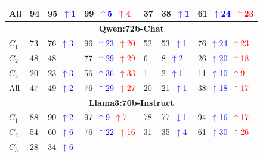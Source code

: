 \begin{table}
\begin{tabularx}{\textwidth}{l X X X X X X}
All 
& 94 
& 95~\textcolor{blue}{\scriptsize$\uparrow$1}   
& 99~\textcolor{blue}{\scriptsize$\uparrow$5}~\textcolor{red}{\scriptsize$\uparrow$4}
& 37 
& 38~\textcolor{blue}{\scriptsize$\uparrow$1}   
& 61~\textcolor{blue}{\scriptsize$\uparrow$24}~\textcolor{red}{\scriptsize$\uparrow$23} \\
\midrule
\multicolumn{7}{c}{\small\textbf{Qwen:72b-Chat}} \\
\midrule
$C_1$ 
& 73 
& 76~\textcolor{blue}{\scriptsize$\uparrow$3}   
& 96~\textcolor{blue}{\scriptsize$\uparrow$23}~\textcolor{red}{\scriptsize$\uparrow$20}
& 52 
& 53~\textcolor{blue}{\scriptsize$\uparrow$1}   
& 76~\textcolor{blue}{\scriptsize$\uparrow$24}~\textcolor{red}{\scriptsize$\uparrow$23} \\
$C_2$ 
& 48
& 48~\textcolor{blue}   
& 77~\textcolor{blue}{\scriptsize$\uparrow$29}~\textcolor{red}{\scriptsize$\uparrow$29}
& 6 
& 8~\textcolor{blue}{\scriptsize$\uparrow$2}   
& 26~\textcolor{blue}{\scriptsize$\uparrow$20}~\textcolor{red}{\scriptsize$\uparrow$18} \\
$C_3$ 
& 20 
& 23~\textcolor{blue}{\scriptsize$\uparrow$3}   
& 56~\textcolor{blue}{\scriptsize$\uparrow$36}~\textcolor{red}{\scriptsize$\uparrow$33}
& 1 
& 2~\textcolor{blue}{\scriptsize$\uparrow$1}   
& 11~\textcolor{blue}{\scriptsize$\uparrow$10}~\textcolor{red}{\scriptsize$\uparrow$9} \\
All 
& 47 
& 49~\textcolor{blue}{\scriptsize$\uparrow$2}   
& 76~\textcolor{blue}{\scriptsize$\uparrow$29}~\textcolor{red}{\scriptsize$\uparrow$27}
& 20 
& 21~\textcolor{blue}{\scriptsize$\uparrow$1}   
& 38~\textcolor{blue}{\scriptsize$\uparrow$18}~\textcolor{red}{\scriptsize$\uparrow$17} \\
\midrule
\multicolumn{7}{c}{\small\textbf{Llama3:70b-Instruct}} \\
\midrule
$C_1$ 
& 88 
& 90~\textcolor{blue}{\scriptsize$\uparrow$2}   
& 97~\textcolor{blue}{\scriptsize$\uparrow$9}~\textcolor{red}{\scriptsize$\uparrow$7}
& 78 
& 77~\textcolor{blue}{\scriptsize$\downarrow$1}   
& 94~\textcolor{blue}{\scriptsize$\uparrow$16}~\textcolor{red}{\scriptsize$\uparrow$17} \\
$C_2$ 
& 54
& 60~\textcolor{blue}{\scriptsize$\uparrow$6}   
& 76~\textcolor{blue}{\scriptsize$\uparrow$22}~\textcolor{red}{\scriptsize$\uparrow$16}
& 31 
& 35~\textcolor{blue}{\scriptsize$\uparrow$4}   
& 61~\textcolor{blue}{\scriptsize$\uparrow$30}~\textcolor{red}{\scriptsize$\uparrow$26} \\
$C_3$ 
& 28 
& 34~\textcolor{blue}{\scriptsize$\uparrow$6}   

\end{tabularx}
\end{table}
